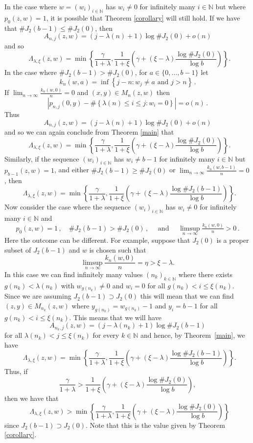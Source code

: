 \documentclass[12pt]{article}
\theoremstyle{remark}
\numberwithin{equation}{section}
\renewcommand{\Bbb}[1]{\mathbb{#1}}
\newcommand{\N}{{\Bbb N}}         %
\newcommand{\0}{\mathbf{0}}
\DeclareMathOperator{\dimh}{\dim_H}
\begin{document}
In the case where $w=(w_i)_{i\in\N}$ has $w_i\neq 0$ for infinitely many $i \in \N$ but where \mbox{$p_{0}(z,w)=1$}, it is possible that Theorem \ref{corollary} will still hold. If we have that $\#J_2(b-1)\leq\#J_2(0)$, then 
\[A_{n,j}(z,w)=(j-\lambda(n)+1)\log\#J_2(0) + o(n)\] 
and so 
$$\dimh\Lambda_{\lambda,\xi}(z,w)=\min\left\{\frac{\gamma}{1+\lambda},\frac{1}{1+\xi}\left(\gamma+(\xi-\lambda)\frac{\log \#J_2(0)}{\log b}\right)\right\}.$$ 
In the case where $\#J_2(b-1)>\#J_2(0)$, for $a\in \{0,\ldots,b-1\}$ let
$$k_n(w,a)=\inf\left\{j-n:w_j\neq a \text{ and } j>n\right\}\, .$$
If $\lim_{n\to\infty}\frac{k_n(w,0)}{n}=0$ and $(x,y)\in M_n(z,w)$ then
\begin{equation*}
    \left| p_{n,j}(0,y)-\#\left\{ \lambda(n)\leq i \leq j : w_{i}=0\right\}\right|=\mathit{o}(n)\, . 
\end{equation*}
Thus
$$A_{n,j}(z,w)=(j-\lambda(n)+1)\log\#J_2(0)+\mathit{o}({n})$$
and so we can again conclude from Theorem \ref{main}  that
$$\dimh\Lambda_{\lambda,\xi}(z,w)=\min\left\{\frac{\gamma}{1+\lambda},\frac{1}{1+\xi}\left(\gamma+(\xi-\lambda)\frac{\log \#J_2(0)}{\log b}\right)\right\}.$$ 
Similarly, if the sequence $(w_{i})_{i\in\N}$ has $w_{i}\neq b-1$ for infinitely many $i\in\N$ but $p_{b-1}(z,w)=1$, and either $\#J_{2}(b-1)\geq \#J_{2}(0)$ or $\lim_{n\to \infty} \tfrac{k_{n}(w,b-1)}{n}=0$, then
\begin{equation*}
    \dimh\Lambda_{\lambda,\xi}(z,w)=\min\left\{\frac{\gamma}{1+\lambda},\frac{1}{1+\xi}\left(\gamma+(\xi-\lambda)\frac{\log \#J_2(b-1)}{\log b}\right)\right\}.
\end{equation*}
Now consider the case where the sequence $(w_{i})_{i\in\N}$ has $w_{i}\neq 0$ for infinitely many $i\in\N$ and 
\begin{equation*}
    p_{0}(z,w)=1 \, , \quad \#J_{2}(b-1)> \#J_{2}(0)\, , \quad \text{ and } \quad  \limsup_{n\to \infty} \tfrac{k_{n}(w,0)}{n}>0\, .
\end{equation*}
Here the outcome can be different. For example, suppose that $J_2(0)$ is a proper subset of $J_2(b-1)$ and $w$ is chosen such that
$$\limsup_{n\to\infty}\frac{k_n(w,0)}{n}=\eta>\xi-\lambda.$$
In this case we can find infinitely many values $(n_k)_{k\in\N}$ where there exists $g(n_{k})<\lambda(n_k)$ with $w_{g(n_{k})}\neq 0$ and $w_i=0$ for all $g(n_{k})< i\leq \xi(n_k)$. Since we are assuming $J_2(b-1)\supset J_2(0)$ this will mean that we can find $(z,y)\in M_{n_{k}}(z,w)$ where $y_{g(n_k)}=w_{g(n_k)}-1$ and $y_i=b-1$ for all $g(n_k)< i\leq \xi(n_k)$. This means that we will have 
$$A_{n_{k},j}(z,w)=(j-\lambda(n_{k})+1)\log\#J_2(b-1)$$
for all $\lambda(n_{k})<j\leq \xi(n_{k})$ for every $k\in\N$ and hence, by Theorem~\ref{main}, we have
$$\dimh\Lambda_{\lambda,\xi}(z,w)=\min\left\{\frac{\gamma}{1+\lambda},\frac{1}{1+\xi}\left(\gamma+(\xi-\lambda)\frac{\log \#J_2(b-1)}{\log b}\right)\right\}.$$ 
Thus, if
\[\frac{\gamma}{1+\lambda}>\frac{1}{1+\xi}\left(\gamma+(\xi-\lambda)\frac{\log \#J_2(0)}{\log b}\right),\] 
then we have that
$$\dimh\Lambda_{\lambda,\xi}(z,w)>\min\left\{\frac{\gamma}{1+\lambda},\frac{1}{1+\xi}\left(\gamma+(\xi-\lambda)\frac{\log \#J_2(0)}{\log b}\right)\right\}$$ 
since $J_2(b-1) \supset J_2(0)$. Note that this is the value given by Theorem \ref{corollary}. 
\end{document}
